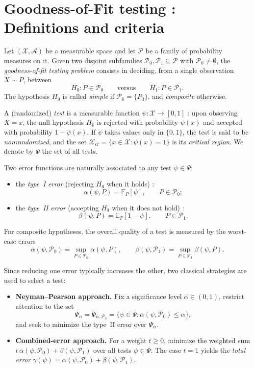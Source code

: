 \section{Goodness-of-Fit testing : Definitions and criteria}

Let $(\mathcal{X}, \mathcal{A})$ be a measurable space and let $\mathcal{P}$ be a family
of probability measures on it. Given two disjoint subfamilies $\mathcal{P}_0, \mathcal{P}_1
\subseteq \mathcal{P}$ with $\mathcal{P}_0 \neq \emptyset$, the \emph{goodness-of-fit
testing problem} consists in deciding, from a single observation $X \sim P$, between
\[
  H_0 : P \in \mathcal{P}_0
  \qquad \text{versus} \qquad
  H_1 : P \in \mathcal{P}_1.
\]
The hypothesis $H_0$ is called \emph{simple} if $\mathcal{P}_0 = \{P_0\}$, and
\emph{composite} otherwise.

\begin{definition}[Test]
A (randomized) \emph{test} is a measurable function $\psi : \mathcal{X} \to [0, 1]$ : upon
observing $X = x$, the null hypothesis $H_0$ is rejected with probability $\psi(x)$ and
accepted with probability $1 - \psi(x)$. If $\psi$ takes values only in $\{0, 1\}$, the
test is said to be \emph{nonrandomized}, and the set
$\mathcal{X}_{\mathrm{cr}} = \{x \in \mathcal{X} : \psi(x) = 1\}$ is its \emph{critical region}.
We denote by $\Psi$ the set of all tests.
\end{definition}

Two error functions are naturally associated to any test $\psi \in \Psi$:
\begin{itemize}
  \item the \emph{type~I error} (rejecting $H_0$ when it holds) :
  \[
    \alpha(\psi, P) = \mathbb{E}_P[\psi], \qquad P \in \mathcal{P}_0;
  \]
  \item the \emph{type~II error} (accepting $H_0$ when it does not hold) :
  \[
    \beta(\psi, P) = \mathbb{E}_P[1 - \psi], \qquad P \in \mathcal{P}_1.
  \]
\end{itemize}
For composite hypotheses, the overall quality of a test is measured by the worst-case
errors
\[
  \alpha(\psi, \mathcal{P}_0) = \sup_{P \in \mathcal{P}_0} \alpha(\psi, P),
  \qquad
  \beta(\psi, \mathcal{P}_1) = \sup_{P \in \mathcal{P}_1} \beta(\psi, P).
\]

Since reducing one error typically increases the other, two classical strategies are used
to select a test:
\begin{itemize}
  \item \textbf{Neyman--Pearson approach.} Fix a significance level $\alpha \in (0, 1)$,
  restrict attention to the set
  \[
    \Psi_\alpha = \Psi_{\alpha, \mathcal{P}_0} = \bigl\{\psi \in \Psi :
      \alpha(\psi, \mathcal{P}_0) \leq \alpha\bigr\},
  \]
  and seek to minimize the type~II error over $\Psi_\alpha$.

  \item \textbf{Combined-error approach.} For a weight $t \geq 0$, minimize the weighted
  sum $t\,\alpha(\psi, \mathcal{P}_0) + \beta(\psi, \mathcal{P}_1)$ over all tests
  $\psi \in \Psi$. The case $t = 1$ yields the \emph{total error}
  $\gamma(\psi) = \alpha(\psi, \mathcal{P}_0) + \beta(\psi, \mathcal{P}_1)$.
\end{itemize}

